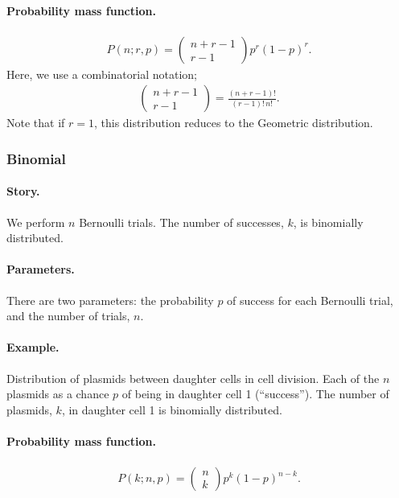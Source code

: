 \paragraph{Probability mass function.}
\begin{align}
P(n;r,p) = \begin{pmatrix}
n+r-1 \\
r-1
\end{pmatrix}
p^r (1-p)^r.
\end{align}
Here, we use a combinatorial notation;
\begin{align}
  \begin{pmatrix}
n+r-1 \\
r-1
\end{pmatrix} = \frac{(n+r-1)!}{(r-1)!\,n!}.
\end{align}
Note that if $r = 1$, this distribution reduces to the Geometric
distribution.



\subsubsection{Binomial}
\paragraph{Story.} We perform $n$ Bernoulli trials.  The number of
successes, $k$, is binomially distributed.
\paragraph{Parameters.} There are two parameters: the probability $p$
of success for each Bernoulli trial, and the number of trials, $n$.
\paragraph{Example.} Distribution of plasmids between daughter cells
in cell division.  Each of the $n$ plasmids as a chance $p$ of being
in daughter cell 1 (``success'').  The number of plasmids, $k$, in
daughter cell 1 is binomially distributed.
\paragraph{Probability mass function.}
\begin{align}
P(k;n,p) = \begin{pmatrix}
n \\
k
\end{pmatrix}
p^k (1-p)^{n-k}.
\end{align}



